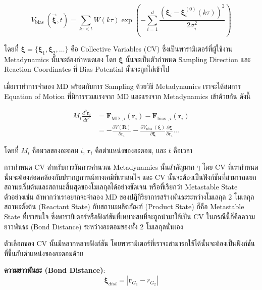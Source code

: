 \begin{equation}
  V_{\text{bias }}(\vec{\boldsymbol{\xi}},t)
  =
  \sum_{ k \tau < t} W(k \tau)
  \exp\left( -\sum_{i=1}^{d} \frac{(\boldsymbol{\xi}_i - \boldsymbol{\xi}_i^{(0)}(k \tau))^2}{2\sigma_i^2} \right)
\end{equation}

\noindent โดยที่ $\boldsymbol{\xi} = \{\boldsymbol{\xi}_{1}, \boldsymbol{\xi}_{2}, \dots\}$ คือ Collective Variables
(CV) ซึ่งเป็นพารามิเตอร์ที่ผู้ใช้งาน Metadynamics นั้นจะต้องกำหนดเอง โดย $\boldsymbol{\xi}$ นั้นจะเป็นตัวกำหนด Sampling Direction
และ Reaction Coordinates ที่ Bias Potential นั้นจะถูกใส่เข้าไป

เมื่อเราทำการจำลอง MD พร้อมกับการ Sampling ด้วยวิธี Metadynamics เราจะได้สมการ Equation of Motion ที่มีการรวมแรงจาก MD
และแรงจาก Metadynamics เข้าด้วยกัน ดังนี้

\begin{align}
  M_i \frac{d^2 \mathbf{r}_i}{d t^2}
   & =
  \mathbf{F}_{\text{MD }, i}\left(\mathbf{r}_i\right)-\mathbf{F}_{\text{bias }, i}\left(\mathbf{r}_i\right) \\
   & =
  -\frac{\partial V(\mathbf{R})}{\partial \mathbf{r}_i}
  -\frac{\partial V_{\text{bias }}(\boldsymbol{\xi})}{\partial \boldsymbol{\xi}}
  \frac{\partial \boldsymbol{\xi}}{\partial \mathbf{r}_i} \ldots
\end{align}

\noindent โดยที่ $M_i$ คือมวลของอะตอม $i$, $\mathbf{r}_i$ คือตำแหน่งของอะตอม, และ $t$ คือเวลา

การกำหนด CV สำหรับการรันการคำนวณ Metadynamics นั้นสำคัญมาก ๆ โดย CV ที่เรากำหนดนั้นจะต้องสอดคล้องกับปรากฏการณ์ทางเคมีที่เราสนใจ
และ CV นั้นจะต้องเป็นฟังก์ชันที่สามารถแยกสถานะเริ่มต้นและสถานะสิ้นสุดของโมเลกุลได้อย่างชัดเจน หรือที่เรียกว่า Metastable State ตัวอย่างเช่น
ถ้าหากว่าเราอยากจะจำลอง MD ของปฏิกิริยาการสร้างพันธะระหว่างโมเลกุล 2 โมเลกุล สถานะตั้งต้น (Reactant State) กับสถานะผลิตภัณฑ์
(Product State) ก็คือ Metastable State ที่เราสนใจ ซึ่งพารามิเตอร์หรือฟังก์ชันที่เหมาะสมที่จะถูกนำมาใช้เป็น CV ในกรณีนี้ก็คือความยาวพันธะ
(Bond Distance) ระหว่างอะตอมของทั้ง 2 โมเลกุลนั่นเอง

ตัวเลือกของ CV นั้นมีหลากหลายฟังก์ชัน โดยพารามิเตอร์ที่เราจะสามารถใช้ได้นั้นจะต้องเป็นฟังก์ชันที่ขึ้นกับตำแหน่งของอะตอมด้วย

\noindent \textbf{ความยาวพันธะ (Bond Distance)}:
\begin{equation}
  \boldsymbol{\xi}_{dist} = |\mathbf{r}_{G_{1}} - {r}_{G_{2}}|
\end{equation}

